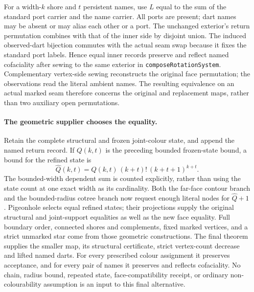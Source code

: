For a width-$k$ shore and $t$ persistent names, use $L$ equal to the sum of
the standard port carrier and the name carrier. All ports are present;
dart names may be absent or may alias each other or a port. The unchanged
exterior's return permutation combines with that of the inner side by
disjoint union. The induced observed-dart bijection commutes with the
actual seam swap because it fixes the standard port labels. Hence equal
inner records preserve and reflect named cofaciality after sewing to the
same exterior in \texttt{composeRotationSystem}.
Complementary vertex-side sewing reconstructs the original face
permutation; the observations read the literal ambient names. The resulting
equivalence on an actual marked seam therefore concerns the original and
replacement maps, rather than two auxiliary open permutations.

\paragraph{The geometric supplier chooses the equality.}
Retain the complete structural and frozen joint-colour state, and append
the named return record. If $Q(k,t)$ is the preceding bounded frozen-state
bound, a bound for the refined state is
\[
 \widehat Q(k,t)=Q(k,t)\,(k+t)!\,(k+t+1)^{k+t}.
\]
The bounded-width dependent sum is counted explicitly, rather than using
the state count at one exact width as its cardinality.
Both the far-face contour branch and the bounded-radius cotree branch
now request enough literal nodes for $\widehat Q+1$. Pigeonhole selects
equal refined states; their projections supply the original structural
and joint-support equalities as well as the new face equality. Full
boundary order, connected shores and complements, fixed marked vertices,
and a strict unmarked star come from those geometric constructions.
The final theorem supplies the smaller map, its structural certificate,
strict vertex-count decrease and lifted named darts. For every prescribed
colour assignment it preserves acceptance, and for every pair of names
it preserves and reflects cofaciality. No chain, radius bound, repeated
state, face-compatibility receipt, or ordinary non-colourability assumption
is an input to this final alternative.

